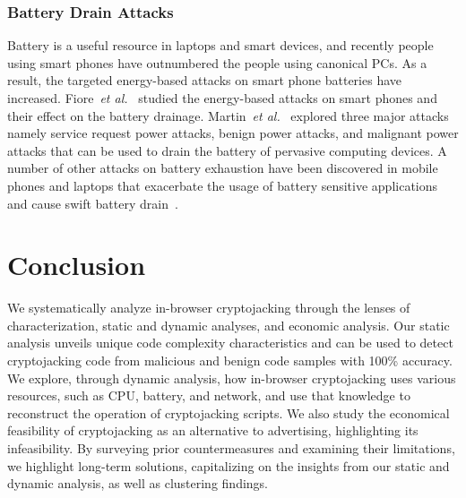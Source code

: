 \documentclass[acmlarge]{acmart}
\newcommand{\cj}{cryptojacking\xspace}
\newcommand{\etal}{{\em et al.}\xspace}
\begin{document}
\subsubsection*{Battery Drain Attacks} Battery is a useful resource in laptops and smart devices, and recently people using smart phones have outnumbered the people using canonical PCs. As a result, the targeted energy-based attacks on smart phone batteries have increased. Fiore~\etal~\cite{FiorePCLS14} studied the energy-based attacks on smart phones and their effect on the battery drainage. Martin~\etal~\cite{MartinHHK04} explored three major attacks namely service request
power attacks, benign power attacks, and malignant power attacks that can be used to drain the battery of pervasive computing devices. A number of other attacks on battery exhaustion have been discovered in mobile phones and laptops that exacerbate the usage of battery sensitive applications and cause swift battery drain~\cite{MoyersDMT10,BuennemeyerGMT07}. 


\section{Conclusion} \label{sec:conclusion}
We systematically analyze in-browser cryptojacking through the lenses of characterization, static and dynamic analyses, and economic analysis. Our static analysis unveils unique code complexity characteristics and can be used to detect \cj code from malicious and benign code samples with 100\% accuracy. We explore, through dynamic analysis, how in-browser \cj uses various resources, such as CPU, battery, and network, and use that knowledge to reconstruct the operation of \cj scripts. We also study the economical feasibility of \cj as an alternative to advertising, highlighting its infeasibility. By surveying prior countermeasures and examining their limitations, we highlight long-term solutions, capitalizing on the insights from our static and dynamic analysis, as well as clustering findings. 




\balance







\end{document}
